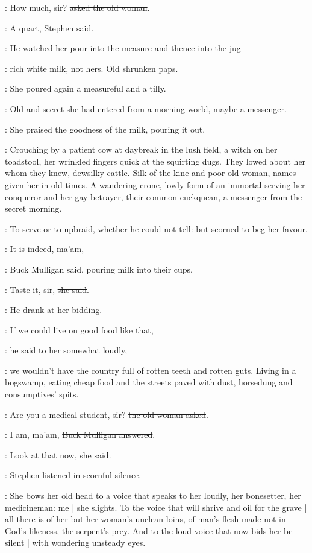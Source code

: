 \OldWoman:
How much, sir?
\sout{asked the old woman}.

\Stephen:
A quart,
\sout{Stephen said}.

:
He watched her pour into the measure
and thence into the jug

\StephenInt:
rich white milk,
not hers.
Old shrunken paps.

:
She poured again a measureful and a tilly.

\StephenInt:
Old and secret she had entered from a morning world,
maybe a messenger.

:
She praised the goodness of the milk, pouring it out.

\StephenInt:
Crouching by a patient cow at daybreak in the lush field,
a witch on her toadstool,
her wrinkled fingers quick at the squirting dugs.
They lowed about her whom they knew,
dewsilky cattle.
Silk of the kine and poor old woman,
names given her in old times.
A wandering crone,
lowly form of an immortal
serving her conqueror and her gay betrayer,
their common cuckquean,
a messenger from the secret morning.

:
To serve or to upbraid,
whether he could not tell:
but scorned to beg her favour.

\Mulligan:
It is indeed, ma'am,

:
Buck Mulligan said,
pouring milk into their cups.

\OldWoman:
Taste it, sir,
\sout{she said}.

:
He drank at her bidding.

\Mulligan:
If we could live on good food like that,

:
he said to her somewhat loudly,

\Mulligan:
we wouldn't have the country full of rotten teeth and rotten guts.
Living in a bogswamp, eating cheap food
and the streets paved with dust, horsedung and consumptives' spits.

\OldWoman:
Are you a medical student, sir?
\sout{the old woman asked}.

\Mulligan:
I am, ma'am,
\sout{Buck Mulligan answered}.

\OldWoman:
Look at that now,
\sout{she said}.


:
Stephen listened in scornful silence.

\StephenInt:
She bows her old head to a voice that speaks to her loudly,
her bonesetter, her medicineman:
me |
she slights.
To the voice that will shrive and oil for the grave |
all there is of her
but her woman's unclean loins,
of man's flesh made not in God's likeness,
the serpent's prey.
And to the loud voice that now bids her be silent |
with wondering unsteady eyes.

